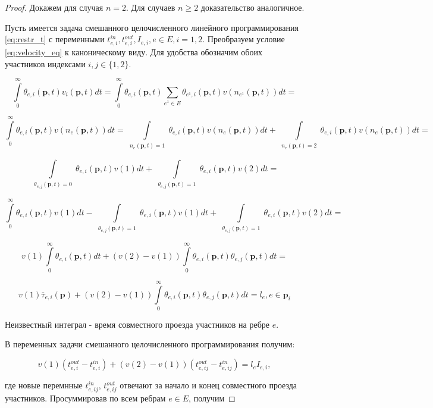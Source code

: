 \documentclass[12pt, a4paper]{article}
\begin{document}
\begin{proof}
	Докажем для случая $n = 2$. Для случаев $n \ge 2$ доказательство аналогичное.
	
	Пусть имеется задача смешанного целочисленного линейного программирования \eqref{eq:restr_t} с переменными $t_{e, i}^{in}, t_{e, i}^{out}, I_{e, i}, e \in E, i = 1, 2$. Преобразуем условие \eqref{eq:velocity_eq} к каноническому виду. Для удобства обозначим обоих участников индексами $i, j \in \{1, 2\}$.
	
	$$\int\limits_{0}^{\infty} \theta_{e, i} (\textbf{p}, t) v_i(\textbf{p}, t)dt = \int\limits_{0}^{\infty} \theta_{e, i} (\textbf{p}, t) \sum \limits _{e^1 \in E} \theta_{e^1, i} (\textbf{p}, t) v (n_{e^1} (\textbf{p}, t)) dt = $$
	
	$$\int\limits_{0}^{\infty} \theta_{e, i} (\textbf{p}, t)  v (n_{e} (\textbf{p}, t)) dt = 
	  \int\limits_{ \substack{n_{e} (\textbf{p}, t) = 1}} \theta_{e, i} (\textbf{p}, t)  v (n_{e} (\textbf{p}, t)) dt +
	  \int\limits_{ \substack{n_{e} (\textbf{p}, t) = 2}} \theta_{e, i} (\textbf{p}, t)  v (n_{e} (\textbf{p}, t)) dt = $$
	
	$$\int\limits_{ \substack{\theta_{e, j} (\textbf{p}, t) = 0}} \theta_{e, i} (\textbf{p}, t)  v (1) dt +
	  \int\limits_{ \substack{\theta_{e, j} (\textbf{p}, t) = 1}} \theta_{e, i} (\textbf{p}, t)  v (2) dt = $$
	  
    $$\int\limits_{0}^{\infty} \theta_{e, i} (\textbf{p}, t)  v (1) dt - 
      \int\limits_{ \substack{\theta_{e, j} (\textbf{p}, t) = 1}} \theta_{e, i} (\textbf{p}, t)  v (1) dt +
	  \int\limits_{ \substack{\theta_{e, j} (\textbf{p}, t) = 1}} \theta_{e, i} (\textbf{p}, t)  v (2) dt = $$
	  
	$$v (1) \int\limits_{0}^{\infty} \theta_{e, i} (\textbf{p}, t) dt +
	  (v (2) - v(1)) \int\limits_{0}^{\infty} \theta_{e, i} (\textbf{p}, t) \theta_{e, j} (\textbf{p}, t) dt = $$
	  
    $$v (1) \overline{\tau}_{e, i} (\textbf{p}) +
    (v (2) - v(1)) \int\limits_{0}^{\infty} \theta_{e, i} (\textbf{p}, t) \theta_{e, j} (\textbf{p}, t) dt = l_e, e \in \textbf{p}_i$$
	  
	Неизвестный интеграл - время совместного проезда участников на ребре $e$.
	  
	В переменных задачи смешанного целочисленного программирования получим:
	
	$$v(1) (t_{e, i}^{out} - t_{e, i}^{in}) + (v(2) - v(1)) (t_{e, ij}^{out} - t_{e, ij}^{in}) = l_e I_{e, i},$$
	
	где новые перемнные $t_{e, ij}^{in}$, $t_{e, ij}^{out}$ отвечают за начало и конец совместного проезда участников. Просуммировав по всем ребрам $e \in E$, получим
	

\end{proof}
\end{document}

